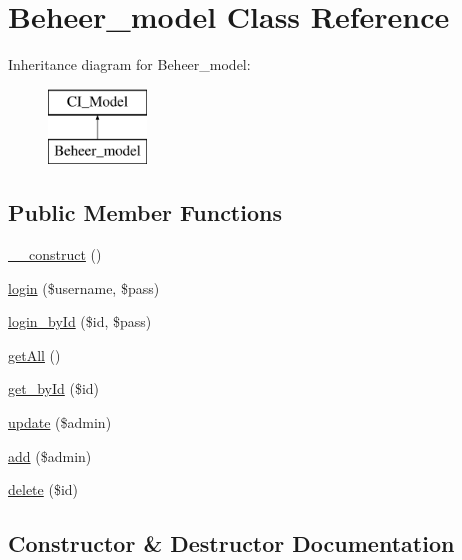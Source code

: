 \hypertarget{class_beheer__model}{}\section{Beheer\+\_\+model Class Reference}
\label{class_beheer__model}
Inheritance diagram for Beheer\+\_\+model\+:\begin{figure}[H]
\begin{center}
\leavevmode
\includegraphics[height=2.000000cm]{class_beheer__model}
\end{center}
\end{figure}
\subsection*{Public Member Functions}
\begin{DoxyCompactItemize}
\item 
\mbox{\hyperlink{class_beheer__model_ae1aa57cc5f5e966459f7c330a8261563}{\+\_\+\+\_\+construct}} ()
\item 
\mbox{\hyperlink{class_beheer__model_ac297793d562dde870e9cd578982f0ae4}{login}} (\$username, \$pass)
\item 
\mbox{\hyperlink{class_beheer__model_a057243930bff44ccfc6257ba079f41a5}{login\+\_\+by\+Id}} (\$id, \$pass)
\item 
\mbox{\hyperlink{class_beheer__model_aba97799db4f1f7370737e0611bbff356}{get\+All}} ()
\item 
\mbox{\hyperlink{class_beheer__model_aea3ea2a1c2a1f62d945524f87fa9ff39}{get\+\_\+by\+Id}} (\$id)
\item 
\mbox{\hyperlink{class_beheer__model_a8b3d24b26b83af152966907ca35672d5}{update}} (\$admin)
\item 
\mbox{\hyperlink{class_beheer__model_ab2055875ff468d37e24df6f110133f9d}{add}} (\$admin)
\item 
\mbox{\hyperlink{class_beheer__model_aac6bca6190704021f57f1a3098524ed6}{delete}} (\$id)
\end{DoxyCompactItemize}


\subsection{Constructor \& Destructor Documentation}
\mbox{\label{class_beheer__model_ae1aa57cc5f5e966459f7c330a8261563}} 
